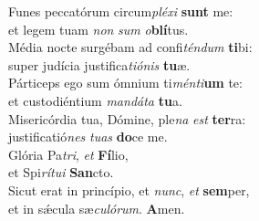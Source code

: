 \oddverse Funes peccatórum circum\textit{plé}\textit{xi} \textbf{sunt} me:~\*\\
\oddverse et legem tuam \textit{non} \textit{sum} \textit{o}\textbf{blí}tus.\\
\evenverse Média nocte surgébam ad confi\textit{tén}\textit{dum} \textbf{ti}bi:~\*\\
\evenverse super judícia justifica\textit{ti}\textit{ó}\textit{nis} \textbf{tu}æ.\\
\oddverse Párticeps ego sum ómnium ti\textit{mén}\textit{ti}\textbf{um} te:~\*\\
\oddverse et custodiéntium \textit{man}\textit{dá}\textit{ta} \textbf{tu}a.\\
\evenverse Misericórdia tua, Dómine, ple\textit{na} \textit{est} \textbf{ter}ra:~\*\\
\evenverse justificatió\textit{nes} \textit{tu}\textit{as} \textbf{do}ce me.\\
\oddverse Glória Pa\textit{tri}, \textit{et} \textbf{Fí}lio,~\*\\
\oddverse et Spi\textit{rí}\textit{tu}\textit{i} \textbf{San}cto.\\
\evenverse Sicut erat in princípio, et \textit{nunc}, \textit{et} \textbf{sem}per,~\*\\
\evenverse et in sǽcula sæ\textit{cu}\textit{ló}\textit{rum}. \textbf{A}men.\\

